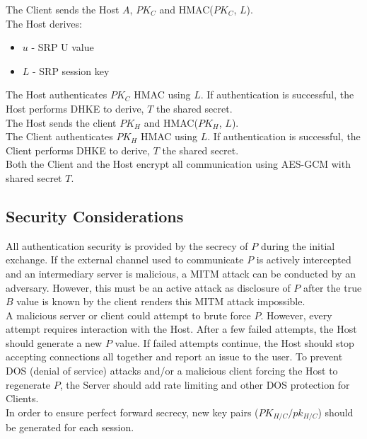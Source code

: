 \documentclass{article}
\begin{document}
    The Client sends the Host $A$, $PK_C$ and HMAC($PK_C$, $L$).\\

    The Host derives:\\
    
    \begin{itemize}
        \item $u$ - SRP U value
        \item $L$ - SRP session key
    \end{itemize}

    The Host authenticates $PK_C$ HMAC using $L$. If authentication is
    successful, the Host performs DHKE to derive, $T$ the shared secret.\\

    The Host sends the client $PK_H$ and HMAC($PK_H$, $L$).\\

    The Client authenticates $PK_H$ HMAC using $L$. If authentication is
    successful, the Client performs DHKE to derive, $T$ the shared secret.\\

    Both the Client and the Host encrypt all communication using AES-GCM with shared
    secret $T$.\\ %

    \subsection{Security Considerations}

    All authentication security is provided by the secrecy of $P$ during the initial
    exchange. If the external channel used to communicate $P$ is actively
    intercepted and an intermediary server is malicious, a MITM attack can be
    conducted by an adversary. However, this must be an active attack as disclosure
    of $P$ after the true $B$ value is known by the client renders this MITM attack
    impossible.\\

    A malicious server or client could attempt to brute force $P$. However, every
    attempt requires interaction with the Host. After a few failed attempts, the
    Host should generate a new $P$ value. If failed attempts continue, the Host
    should stop accepting connections all together and report an issue to the user.
    To prevent DOS (denial of service) attacks and/or a malicious client forcing the
    Host to regenerate $P$, the Server should add rate limiting and other DOS
    protection for Clients.\\

    In order to ensure perfect forward secrecy, new key pairs
    ($PK_{H/C}/pk_{H/C}$) should be generated for each session.
\end{document}
